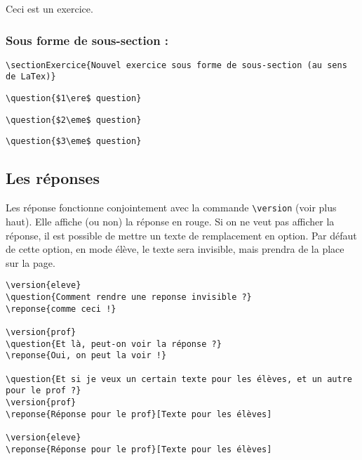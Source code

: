 \documentclass[a4paper,10pt]{article}
\begin{document}
\begin{exercice}[Exo1]
	Ceci est un exercice.
\end{exercice}
\begin{exercice}[Exo2]
\end{exercice}

			\subsubsection{Sous forme de sous-section :}

\verb!\sectionExercice{Nouvel exercice sous forme de sous-section (au sens de LaTex)}!

\verb!\question{$1\ere$ question}!

\verb!\question{$2\eme$ question}!

\verb!\question{$3\eme$ question}!



		\subsection{Les réponses}

			Les réponse fonctionne conjointement avec la commande \verb!\version! (voir plus haut).
			Elle affiche (ou non) la réponse en rouge.
			Si on ne veut pas afficher la réponse, il est possible de mettre un texte de remplacement en option.
			Par défaut de cette option, en mode élève, le texte sera invisible, mais prendra de la place sur la page.
		\begin{verbatim}
\version{eleve}
\question{Comment rendre une reponse invisible ?}
\reponse{comme ceci !}

\version{prof}
\question{Et là, peut-on voir la réponse ?}
\reponse{Oui, on peut la voir !}

\question{Et si je veux un certain texte pour les élèves, et un autre pour le prof ?}
\version{prof}
\reponse{Réponse pour le prof}[Texte pour les élèves]

\version{eleve}
\reponse{Réponse pour le prof}[Texte pour les élèves]
		\end{verbatim}

\end{document}
